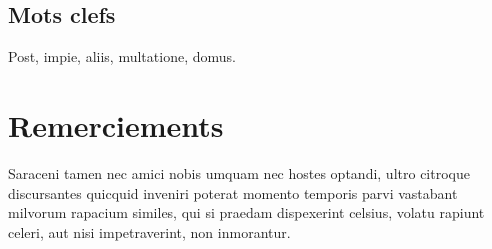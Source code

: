\documentclass[oneside]{memoir}
\begin{document}
\section*{Mots clefs}
Post, impie, aliis, multatione, domus.

\pagebreak
              

\setcounter{secnumdepth}{4} 
\setcounter{tocdepth}{4}





\chapter*{Remerciements}
Saraceni tamen nec amici nobis umquam nec hostes optandi, ultro
citroque discursantes quicquid inveniri poterat momento temporis parvi
vastabant milvorum rapacium similes, qui si praedam dispexerint
celsius, volatu rapiunt celeri, aut nisi impetraverint, non
inmorantur.
     
\nocite{*}


%
  

\appendix

% 
\end{document}
